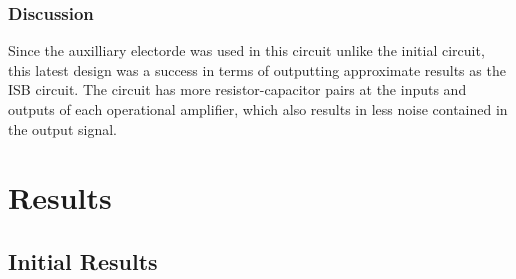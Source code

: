 \subsection{Discussion}
Since the auxilliary electorde was used in this circuit unlike the initial circuit, this latest design was a success in terms of outputting approximate results as the ISB circuit. The circuit has more resistor-capacitor pairs at the inputs and outputs of each operational amplifier, which also results in less noise contained in the output signal.

\chapter{Results}  
\section{Initial Results}




